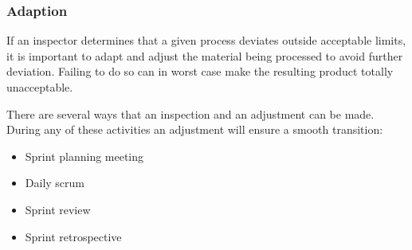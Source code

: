 \subsubsection{Adaption}

If an inspector determines that a given process deviates outside acceptable limits, it is
important to adapt and adjust the material being processed to avoid further
deviation. Failing to do so can in worst case make the resulting product
totally unacceptable\cite{scrumguide11}.

There are several ways that an inspection and an adjustment can be made. During
any of these activities an adjustment will ensure a smooth transition:

\begin{itemize}
	\item Sprint planning meeting
	\item	Daily scrum
	\item	Sprint review
	\item	Sprint retrospective
\end{itemize}